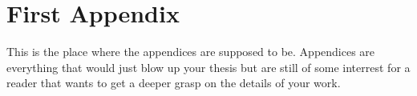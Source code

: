 \documentclass[12pt, a4paper, fleqn]{memoir}%
\begin{document}
\chapter{First Appendix}
\label{app:FirstAppendix}
This is the place where the appendices are supposed to be. Appendices are everything that would just blow up your thesis but are still of some interrest for a reader that wants to get a deeper grasp on the details of your work. 

\backmatter

\end{document}
